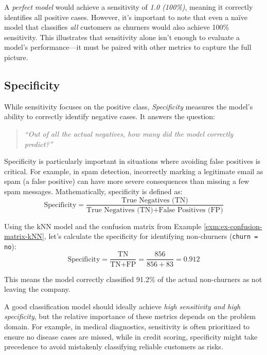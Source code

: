 \documentclass[
]{book}
\newcommand{\passthrough}[1]{#1}
\theoremstyle{definition}
\theoremstyle{definition}
\theoremstyle{definition}
\theoremstyle{definition}
\theoremstyle{remark}
\begin{document}
A \emph{perfect model} would achieve a sensitivity of \emph{1.0 (100\%)}, meaning it correctly identifies all positive cases. However, it's important to note that even a naïve model that classifies \emph{all} customers as churners would also achieve 100\% sensitivity. This illustrates that sensitivity alone isn't enough to evaluate a model's performance---it must be paired with other metrics to capture the full picture.

\subsection*{Specificity}\label{specificity}

While sensitivity focuses on the positive class, \emph{Specificity} measures the model's ability to correctly identify negative cases. It answers the question:

\begin{quote}
\emph{``Out of all the actual negatives, how many did the model correctly predict?''}
\end{quote}

Specificity is particularly important in situations where avoiding false positives is critical. For example, in spam detection, incorrectly marking a legitimate email as spam (a false positive) can have more severe consequences than missing a few spam messages. Mathematically, specificity is defined as:\\
\[
\text{Specificity} = \frac{\text{True Negatives (TN)}}{\text{True Negatives (TN)} + \text{False Positives (FP)}}
\]

Using the kNN model and the confusion matrix from Example \ref{exm:ex-confusion-matrix-kNN}, let's calculate the specificity for identifying non-churners (\passthrough{\lstinline!churn = no!}):\\
\[
\text{Specificity} = \frac{\text{TN}}{\text{TN} + \text{FP}} = \frac{856}{856 + 83} = 0.912
\]

This means the model correctly classified 91.2\% of the actual non-churners as not leaving the company.

A good classification model should ideally achieve \emph{high sensitivity and high specificity}, but the relative importance of these metrics depends on the problem domain. For example, in medical diagnostics, sensitivity is often prioritized to ensure no disease cases are missed, while in credit scoring, specificity might take precedence to avoid mistakenly classifying reliable customers as risks.
\end{document}
